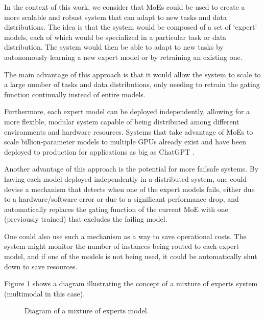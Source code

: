 \documentclass[../main.tex]{subfiles}
\begin{document}
    In the context of this work, we consider that MoEs could be used to create a more scalable and robust system that can adapt to new tasks and data distributions. The idea is that the system would be composed of a set of `expert' models, each of which would be specialized in a particular task or data distribution. The system would then be able to adapt to new tasks by autonomously learning a new expert model or by retraining an existing one.
    
    The main advantage of this approach is that it would allow the system to scale to a large number of tasks and data distributions, only needing to retrain the gating function continually instead of entire models. 
    
    Furthermore, each expert model can be deployed independently, allowing for a more flexible, modular system capable of being distributed among different environments and hardware resources. Systems that take advantage of MoEs to scale billion-parameter models to multiple GPUs already exist and have been deployed to production for applications as big as ChatGPT .
    
    Another advantage of this approach is the potential for more failsafe systems. By having each model deployed independently in a distributed system, one could devise a mechanism that detects when one of the expert models fails, either due to a hardware/software error or due to a significant performance drop, and automatically replaces the gating function of the current MoE with one (previously trained) that excludes the failing model.
    
    One could also use such a mechanism as a way to save operational costs. The system might monitor the number of instances being routed to each expert model, and if one of the models is not being used, it could be automatically shut down to save resources.

    Figure \ref{fig:moes} shows a diagram illustrating the concept of a mixture of experts system (multimodal in this case).

    \begin{figure}[H]
        \centering
        \caption{Diagram of a mixture of experts model.}
        \resizebox*{0.8\linewidth}{!}{
            
        }
        \label{fig:moes}
    \end{figure}

  
\end{document}
